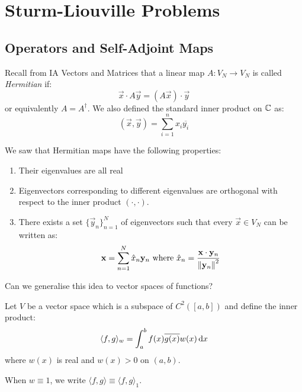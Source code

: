 \documentclass[../main.tex]{subfiles}
\begin{document}
\chapter{Sturm-Liouville Problems}
\section{Operators and Self-Adjoint Maps}
\begin{remark}[Recap]
  Recall from IA Vectors and Matrices that a linear map $A: V_N \to V_N$ is called \textit{Hermitian} if:
  \[
    \vec{x} \cdot A \vec{y} = (A \vec{x}) \cdot \vec{y}
  \]
  or equivalently $A = A^{\dag}$.
  We also defined the standard inner product on $\mathbb{C}$ as:
  \[
    (\vec{x}, \vec{y}) = \sum_{i = 1}^{n} x_i \overline{y_i}
  \]

  We saw that Hermitian maps have the following properties:
  \begin{enumerate}
    \item Their eigenvalues are all real
    \item Eigenvectors corresponding to different eigenvalues are orthogonal with respect to the inner product $(\cdot, \cdot)$.
    \item There exists a set $\{\vec{y}_n\}^{N}_{n = 1}$ of eigenvectors such that every $\vec{x} \in V_N$ can be written as:
      \[
        \mathbf{\bm{x}} = \sum_{n = 1}^{N} \hat{x}_n \mathbf{\bm{y}}_n \text{ where } \hat{x}_n = \frac{\mathbf{\bm{x}} \cdot \mathbf{\bm{y}}_n}{\left\lVert \mathbf{\bm{y}}_n \right\rVert^2}
      \]
  \end{enumerate}
\end{remark}
Can we generalise this idea to vector spaces of functions?

Let $V$ be a vector space which is a subspace of $C^2([a, b])$ and define the inner product:
\[
  \langle f, g \rangle_{w} = \int_{a}^{b} f(x) \overline{g(x)} w(x) \d{x}
\]
where $w(x)$ is real and $w(x) > 0$ on $(a, b)$.
\begin{remark}[Notation]
  When $w \equiv 1$, we write $\langle f, g \rangle \equiv \langle f, g \rangle_{1}$.
\end{remark}
\end{document}
